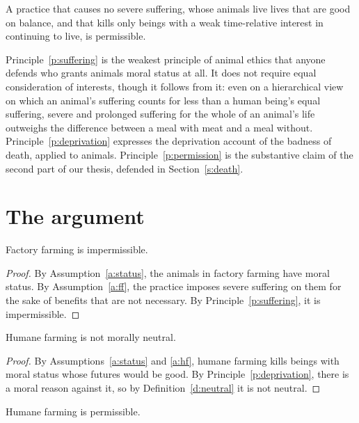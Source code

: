 \documentclass{situationist-preprint}
\begin{document}
\begin{principle}\label{p:permission}
A practice that causes no severe suffering, whose animals live lives that are good on balance, and that kills only beings with a weak time-relative interest in continuing to live, is permissible.
\end{principle}

Principle~\ref{p:suffering} is the weakest principle of animal ethics that anyone defends who grants animals moral status at all. It does not require equal consideration of interests, though it follows from it: even on a hierarchical view on which an animal's suffering counts for less than a human being's equal suffering, severe and prolonged suffering for the whole of an animal's life outweighs the difference between a meal with meat and a meal without. Principle~\ref{p:deprivation} expresses the deprivation account of the badness of death, applied to animals. Principle~\ref{p:permission} is the substantive claim of the second part of our thesis, defended in Section~\ref{s:death}.

\section{The argument}

\begin{theorem}\label{t:ff}
Factory farming is impermissible.
\end{theorem}

\begin{proof}
By Assumption~\ref{a:status}, the animals in factory farming have moral status. By Assumption~\ref{a:ff}, the practice imposes severe suffering on them for the sake of benefits that are not necessary. By Principle~\ref{p:suffering}, it is impermissible.
\end{proof}

\begin{proposition}\label{p:reason}
Humane farming is not morally neutral.
\end{proposition}

\begin{proof}
By Assumptions~\ref{a:status} and \ref{a:hf}, humane farming kills beings with moral status whose futures would be good. By Principle~\ref{p:deprivation}, there is a moral reason against it, so by Definition~\ref{d:neutral} it is not neutral.
\end{proof}

\begin{theorem}\label{t:hf}
Humane farming is permissible.
\end{theorem}
\end{document}
